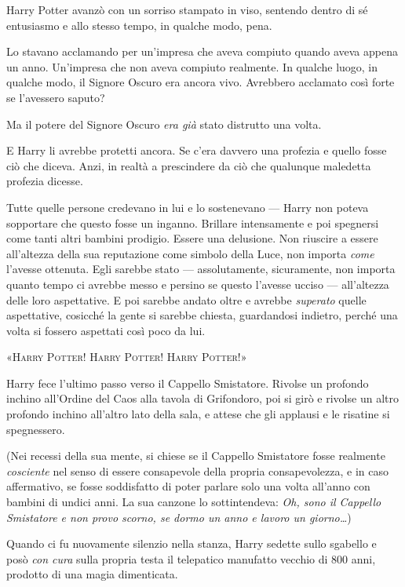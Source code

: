 Harry Potter avanzò con un sorriso stampato in viso, sentendo dentro di sé entusiasmo e allo stesso tempo, in qualche modo, pena.

Lo stavano acclamando per un’impresa che aveva compiuto quando aveva appena un anno. Un’impresa che non aveva compiuto realmente. In qualche luogo, in qualche modo, il Signore Oscuro era ancora vivo. Avrebbero acclamato così forte se l’avessero saputo?

Ma il potere del Signore Oscuro \textit{era già} stato distrutto una volta.

E Harry li avrebbe protetti ancora. Se c’era davvero una profezia e quello fosse ciò che diceva. Anzi, in realtà a prescindere da ciò che qualunque maledetta profezia dicesse.

Tutte quelle persone credevano in lui e lo sostenevano — Harry non poteva sopportare che questo fosse un inganno. Brillare intensamente e poi spegnersi come tanti altri bambini prodigio. Essere una delusione. Non riuscire a essere all’altezza della sua reputazione come simbolo della Luce, non importa \textit{come} l’avesse ottenuta. Egli sarebbe stato — assolutamente, sicuramente, non importa quanto tempo ci avrebbe messo e persino se questo l’avesse ucciso — all’altezza delle loro aspettative. E poi sarebbe andato oltre e avrebbe \textit{superato} quelle aspettative, cosicché la gente si sarebbe chiesta, guardandosi indietro, perché una volta si fossero aspettati così poco da lui.

«\textsc{Harry Potter! Harry Potter! Harry Potter!}»

Harry fece l’ultimo passo verso il Cappello Smistatore. Rivolse un profondo inchino all’Ordine del Caos alla tavola di Grifondoro, poi si girò e rivolse un altro profondo inchino all’altro lato della sala, e attese che gli applausi e le risatine si spegnessero.

(Nei recessi della sua mente, si chiese se il Cappello Smistatore fosse realmente \textit{cosciente} nel senso di essere consapevole della propria consapevolezza, e in caso affermativo, se fosse soddisfatto di poter parlare solo una volta all’anno con bambini di undici anni. La sua canzone lo sottintendeva: \textit{Oh, sono il Cappello Smistatore e non provo scorno, se dormo un anno e lavoro un giorno…})

Quando ci fu nuovamente silenzio nella stanza, Harry sedette sullo sgabello e posò \textit{con cura} sulla propria testa il telepatico manufatto vecchio di 800 anni, prodotto di una magia dimenticata.

